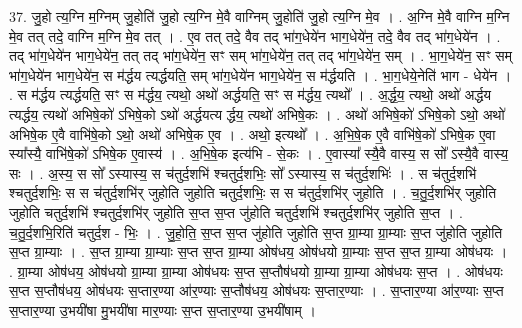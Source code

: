 \documentclass[17pt]{extarticle}
\begin{document}
37. जु॒हो त्य॒ग्नि म॒ग्निम् जु॒होति॑ जु॒हो त्य॒ग्नि मे॒वै वाग्निम् जु॒होति॑ जु॒हो त्य॒ग्नि मे॒व । . अ॒ग्नि मे॒वै वाग्नि म॒ग्नि मे॒व तत् तदे॒ वाग्नि म॒ग्नि मे॒व तत् । . ए॒व तत् तदे॒ वैव तद् भा॑ग॒धेये॑न भाग॒धेये॑न॒ तदे॒ वैव तद् भा॑ग॒धेये॑न । . तद् भा॑ग॒धेये॑न भाग॒धेये॑न॒ तत् तद् भा॑ग॒धेये॑न॒ सꣳ सम् भा॑ग॒धेये॑न॒ तत् तद् भा॑ग॒धेये॑न॒ सम् । . भा॒ग॒धेये॑न॒ सꣳ सम् भा॑ग॒धेये॑न भाग॒धेये॑न॒ स म॑र्द्धय त्यर्द्धयति॒ सम् भा॑ग॒धेये॑न भाग॒धेये॑न॒ स म॑र्द्धयति । . भा॒ग॒धेये॒नेति॑ भाग - धेये॑न । . स म॑र्द्धय त्यर्द्धयति॒ सꣳ स म॑र्द्धय॒ त्यथो॒ अथो॑ अर्द्धयति॒ सꣳ स म॑र्द्धय॒ त्यथो᳚ । . अ॒र्द्ध॒य॒ त्यथो॒ अथो॑ अर्द्धय त्यर्द्धय॒ त्यथो॑ अभिषे॒को॑ ऽभिषे॒को ऽथो॑ अर्द्धयत्य र्द्धय॒ त्यथो॑ अभिषे॒कः । . अथो॑ अभिषे॒को॑ ऽभिषे॒को ऽथो॒ अथो॑ अभिषे॒क ए॒वै वाभि॑षे॒को ऽथो॒ अथो॑ अभिषे॒क ए॒व । . अथो॒ इत्यथो᳚ । . अ॒भि॒षे॒क ए॒वै वाभि॑षे॒को॑ ऽभिषे॒क ए॒वा स्या᳚स्यै॒ वाभि॑षे॒को॑ ऽभिषे॒क ए॒वास्य॑ । . अ॒भि॒षे॒क इत्य॑भि - से॒कः । . ए॒वास्या᳚ स्यै॒वै वास्य॒ स सो᳚ ऽस्यै॒वै वास्य॒ सः । . अ॒स्य॒ स सो᳚ ऽस्यास्य॒ स च॑तुर्द॒शभि॑ श्चतुर्द॒शभिः॒ सो᳚ ऽस्यास्य॒ स च॑तुर्द॒शभिः॑ । . स च॑तुर्द॒शभि॑ श्चतुर्द॒शभिः॒ स स च॑तुर्द॒शभि॑र् जुहोति जुहोति चतुर्द॒शभिः॒ स स च॑तुर्द॒शभि॑र् जुहोति । . च॒तु॒र्द॒शभि॑र् जुहोति जुहोति चतुर्द॒शभि॑ श्चतुर्द॒शभि॑र् जुहोति स॒प्त स॒प्त जु॑होति चतुर्द॒शभि॑ श्चतुर्द॒शभि॑र् जुहोति स॒प्त । . च॒तु॒र्द॒शभि॒रिति॑ चतुर्द॒श - भिः॒ । . जु॒हो॒ति॒ स॒प्त स॒प्त जु॑होति जुहोति स॒प्त ग्रा॒म्या ग्रा॒म्याः स॒प्त जु॑होति जुहोति स॒प्त ग्रा॒म्याः । . स॒प्त ग्रा॒म्या ग्रा॒म्याः स॒प्त स॒प्त ग्रा॒म्या ओष॑धय॒ ओष॑धयो ग्रा॒म्याः स॒प्त स॒प्त ग्रा॒म्या ओष॑धयः । . ग्रा॒म्या ओष॑धय॒ ओष॑धयो ग्रा॒म्या ग्रा॒म्या ओष॑धयः स॒प्त स॒प्तौष॑धयो ग्रा॒म्या ग्रा॒म्या ओष॑धयः स॒प्त । . ओष॑धयः स॒प्त स॒प्तौष॑धय॒ ओष॑धयः स॒प्तार॒ण्या आ॑र॒ण्याः स॒प्तौष॑धय॒ ओष॑धयः स॒प्तार॒ण्याः । . स॒प्तार॒ण्या आ॑र॒ण्याः स॒प्त स॒प्तार॒ण्या उ॒भयी॑षा मु॒भयी॑षा मार॒ण्याः स॒प्त स॒प्तार॒ण्या उ॒भयी॑षाम् । \newline
\pagebreak
{}
\end{document}
